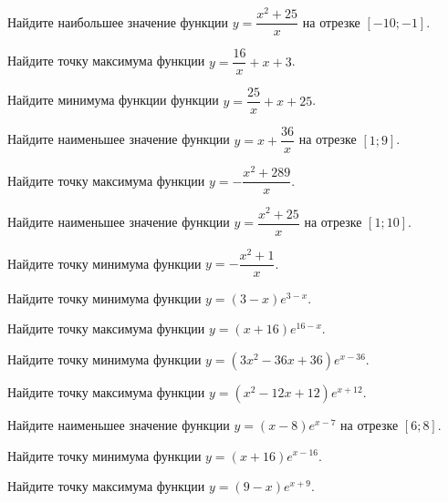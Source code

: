 \begin{class}[number=2]
\begin{listofex}
		\item Найдите наибольшее значение функции \( y=\dfrac{ x^2+25 }{ x } \) на отрезке \( [-10;-1] \).
		\item Найдите точку максимума функции \( y=\dfrac{ 16 }{ x }+x+3 \).
		\item Найдите минимума функции функции \( y=\dfrac{ 25 }{ x }+x+25 \).
		\item Найдите наименьшее значение функции \( y=x+\dfrac{ 36 }{ x } \) на отрезке \( [1;9] \).
		\item Найдите точку максимума функции \( y=-\dfrac{ x^2+289 }{ x } \).
		\item Найдите наименьшее значение функции \( y=\dfrac{x^2+25  }{ x } \) на отрезке \([1;10]\).
		\item Найдите точку минимума функции \( y=-\dfrac{ x^2+1 }{ x } \).
		
		\item Найдите точку минимума функции \( y=(3-x)e^{3-x} \).
		\item Найдите точку максимума функции \( y=(x+16)e^{16-x} \).
		\item Найдите точку минимума функции \( y=(3x^2-36x+36)e^{x-36} \).
		\item Найдите точку максимума функции \( y=(x^2-12x+12)e^{x+12} \).
		\item Найдите наименьшее значение функции \( y=(x-8)e^{x-7} \) на отрезке \([6;8]\).
		\item Найдите точку минимума функции \( y=(x+16)e^{x-16} \).
		\item Найдите точку максимума функции \( y=(9-x)e^{x+9} \).
	\end{listofex}
\end{class}


